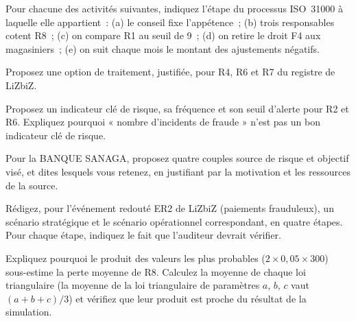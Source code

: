\bigskip

\begin{boxexo}[title={\ding{45}\quad Exercice~5.1. Le processus \niveaubase}]
Pour chacune des activités suivantes, indiquez l'étape du processus
ISO~31000 à laquelle elle appartient~: (a) le conseil fixe l'appétence~;
(b) trois responsables cotent R8~; (c) on compare R1 au seuil de 9~; (d) on
retire le droit F4 aux magasiniers~; (e) on suit chaque mois le montant des
ajustements négatifs.
\end{boxexo}

\begin{boxexo}[title={\ding{45}\quad Exercice~5.2. Choisir une option \niveaubase}]
Proposez une option de traitement, justifiée, pour R4, R6 et R7 du registre
de LiZbiZ.
\end{boxexo}

\begin{boxexo}[title={\ding{45}\quad Exercice~5.3. Des indicateurs \niveaumoyen}]
Proposez un indicateur clé de risque, sa fréquence et son seuil d'alerte
pour R2 et R6. Expliquez pourquoi « nombre d'incidents de fraude » n'est pas
un bon indicateur clé de risque.
\end{boxexo}

\begin{boxexo}[title={\ding{45}\quad Exercice~5.4. Atelier 2 d'EBIOS \niveaumoyen}]
Pour la BANQUE SANAGA, proposez quatre couples source de risque et
objectif visé, et dites lesquels vous retenez, en justifiant par la
motivation et les ressources de la source.
\end{boxexo}

\begin{boxexo}[title={\ding{45}\quad Exercice~5.5. Un scénario opérationnel \niveaumoyen}]
Rédigez, pour l'événement redouté ER2 de LiZbiZ (paiements frauduleux), un
scénario stratégique et le scénario opérationnel correspondant, en quatre
étapes. Pour chaque étape, indiquez le fait que l'auditeur devrait vérifier.
\end{boxexo}

\begin{boxexo}[title={\ding{45}\quad Exercice~5.6. Le calcul rapide \niveaumoyen}]
Expliquez pourquoi le produit des valeurs les plus probables
($2 \times 0{,}05 \times 300$) sous-estime la perte moyenne de R8. Calculez
la moyenne de chaque loi triangulaire (la moyenne de la loi triangulaire
de paramètres $a$, $b$, $c$ vaut $(a+b+c)/3$) et vérifiez que leur produit
est proche du résultat de la simulation.
\end{boxexo}

